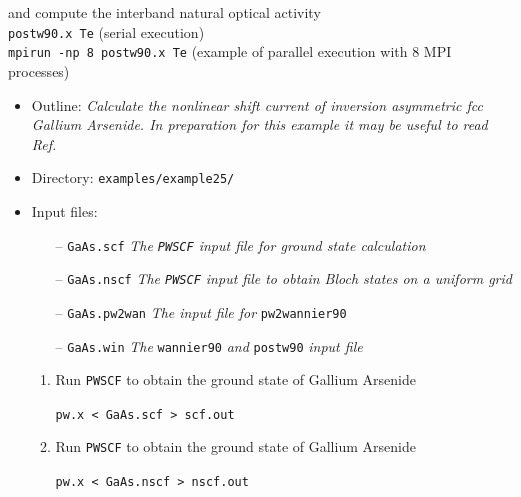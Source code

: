 \documentclass[a4paper,11pt,twoside]{article}
\begin{document}
\begin{enumerate}
and compute the interband natural optical activity\\

  {\tt postw90.x Te} (serial execution)\\
  {\tt mpirun -np 8 postw90.x Te} (example of parallel execution with
  8 MPI processes) \\





\end{enumerate}


\begin{itemize}

\item Outline: \textit{Calculate the nonlinear shift current of inversion asymmetric fcc Gallium Arsenide. In preparation for this example it may be useful to read Ref.
\cite{ibanez-azpiroz_ab_2018} }



\item Directory: \verb|examples/example25/|

\item Input files:

\begin{itemize}

\item[--] \verb|GaAs.scf| \textit{The {\tt PWSCF} input file for ground state calculation}
\item[--] \verb|GaAs.nscf| \textit{The {\tt PWSCF} input file to obtain Bloch states on a uniform grid}
\item[--] \verb|GaAs.pw2wan| \textit{The input file for} \verb|pw2wannier90|
\item[--] \verb|GaAs.win| \textit{The} \verb|wannier90| \textit{and} \verb|postw90| \textit{input file}


\end{itemize}


\begin{enumerate}

\item Run {\tt PWSCF} to obtain the ground state of Gallium Arsenide

\verb|pw.x < GaAs.scf > scf.out|


\item Run {\tt PWSCF} to obtain the ground state of Gallium Arsenide

\verb|pw.x < GaAs.nscf > nscf.out|


\end{enumerate}
\end{itemize}
\end{document}
